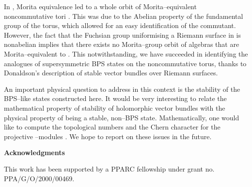 \documentclass[a4paper,a4paper]{article}
\begin{document}
In \coordHE{}, Morita equivalence led to a whole \coordHE{} orbit of  
Morita--equivalent noncommutative tori \cite{SCHWARZ}. This was due to the 
Abelian property of the fundamental group of the torus, which allowed for 
an easy identification of the commutant. However, the fact that the Fuchsian 
group uniformising a Riemann surface in \coordHE{} is nonabelian implies that 
there exists no Morita--group orbit of \coordHE{} 
algebras that are Morita--equivalent to \coordHE{}. 
This notwithstanding, we have succeeded in identifying the \coordHE{} analogues 
of supersymmetric BPS states on the noncommutative torus, 
thanks to Donaldson's description of stable vector bundles 
over Riemann surfaces.

An important physical question to address in this context is the 
stability of the BPS--like states constructed here. It would be very 
interesting to relate the mathematical property of stability of holomorphic 
vector bundles with the physical property of being a stable, non--BPS state.
Mathematically, one would like to compute the topological numbers 
and the Chern character for the projective \coordHE{}--modules \coordHE{}. 
We hope to report on these issues in the future.
 
{\bf Acknowledgments} 

This work has been supported by a PPARC fellowship under grant no. PPA/G/O/2000/00469.
\end{document}
